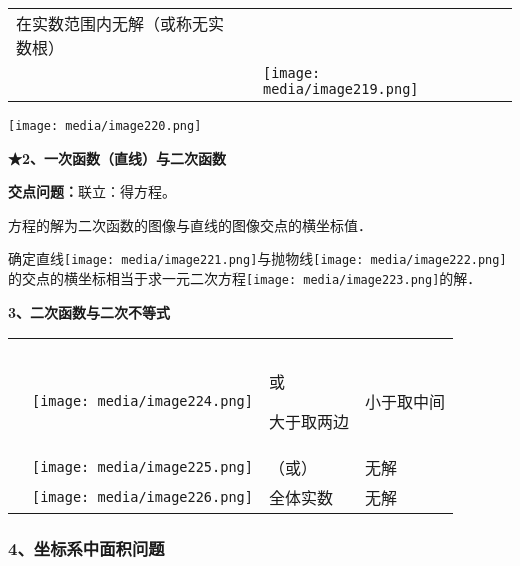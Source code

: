 \documentclass[a4paper,11pt,UTF8]{ctexart}
\begin{document}
\begin{longtable}[]{@{}lllll@{}}
\begin{minipage}[t]{0.17\columnwidth}
在实数范围内无解（或称无实数根）\strut
\end{minipage}\tabularnewline
& &
\texttt{[image: media/image219.png]} &
&\tabularnewline
\bottomrule
\end{longtable}

\texttt{[image: media/image220.png]}

\textbf{★2、一次函数（直线）与二次函数}

\textbf{交点问题：}联立：得方程。

方程的解为二次函数的图像与直线的图像交点的横坐标值．

确定直线\texttt{[image: media/image221.png]}与抛物线\texttt{[image: media/image222.png]}的交点的横坐标相当于求一元二次方程\texttt{[image: media/image223.png]}的解．

\textbf{3、二次函数与二次不等式}

\begin{longtable}[]{@{}llll@{}}
\toprule
\endhead
& & &\tabularnewline
& & &\tabularnewline
\begin{minipage}[t]{0.22\columnwidth}\raggedright
\strut
\end{minipage} & \begin{minipage}[t]{0.22\columnwidth}\raggedright
\texttt{[image: media/image224.png]}\strut
\end{minipage} & \begin{minipage}[t]{0.22\columnwidth}\raggedright
或

大于取两边\strut
\end{minipage} & \begin{minipage}[t]{0.22\columnwidth}\raggedright
小于取中间\strut
\end{minipage}\tabularnewline
& \texttt{[image: media/image225.png]} &
（或） & 无解\tabularnewline
& \texttt{[image: media/image226.png]}
& 全体实数 & 无解\tabularnewline
\bottomrule
\end{longtable}

\hypertarget{ux5750ux6807ux7cfbux4e2dux9762ux79efux95eeux9898}{%
\subsubsection{\texorpdfstring{\textbf{4、坐标系中面积问题}}{4、坐标系中面积问题}}\label{ux5750ux6807ux7cfbux4e2dux9762ux79efux95eeux9898}}
\end{document}

